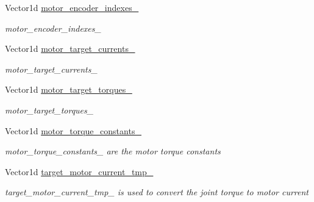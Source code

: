 \begin{DoxyCompactItemize}
\mbox{\label{classblmc__robots_1_1SingleMotor_ab0ec410b7018e2f1c71d779c4b018622}} 
Vector1d \hyperlink{classblmc__robots_1_1SingleMotor_ab0ec410b7018e2f1c71d779c4b018622}{motor\+\_\+encoder\+\_\+indexes\+\_\+}
\begin{DoxyCompactList}\small\item\em motor\+\_\+encoder\+\_\+indexes\+\_\+ \end{DoxyCompactList}\item 
\mbox{\label{classblmc__robots_1_1SingleMotor_aa8abc257d4336ef830317f2371e3ce11}} 
Vector1d \hyperlink{classblmc__robots_1_1SingleMotor_aa8abc257d4336ef830317f2371e3ce11}{motor\+\_\+target\+\_\+currents\+\_\+}
\begin{DoxyCompactList}\small\item\em motor\+\_\+target\+\_\+currents\+\_\+ \end{DoxyCompactList}\item 
\mbox{\label{classblmc__robots_1_1SingleMotor_a787f1cf4697845acb7ad32f61ba2a610}} 
Vector1d \hyperlink{classblmc__robots_1_1SingleMotor_a787f1cf4697845acb7ad32f61ba2a610}{motor\+\_\+target\+\_\+torques\+\_\+}
\begin{DoxyCompactList}\small\item\em motor\+\_\+target\+\_\+torques\+\_\+ \end{DoxyCompactList}\item 
\mbox{\label{classblmc__robots_1_1SingleMotor_af3c3dd00a54f188ef35a0a58f2aeea9a}} 
Vector1d \hyperlink{classblmc__robots_1_1SingleMotor_af3c3dd00a54f188ef35a0a58f2aeea9a}{motor\+\_\+torque\+\_\+constants\+\_\+}
\begin{DoxyCompactList}\small\item\em motor\+\_\+torque\+\_\+constants\+\_\+ are the motor torque constants \end{DoxyCompactList}\item 
\mbox{\label{classblmc__robots_1_1SingleMotor_a3bee7675bed7fe92763dbe5c63e5d38b}} 
Vector1d \hyperlink{classblmc__robots_1_1SingleMotor_a3bee7675bed7fe92763dbe5c63e5d38b}{target\+\_\+motor\+\_\+current\+\_\+tmp\+\_\+}
\begin{DoxyCompactList}\small\item\em target\+\_\+motor\+\_\+current\+\_\+tmp\+\_\+ is used to convert the joint torque to motor current \end{DoxyCompactList}\item 

\end{DoxyCompactItemize}
